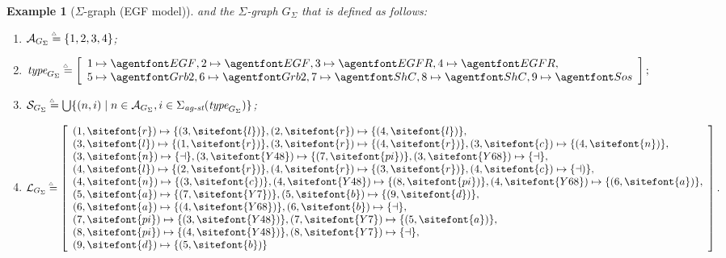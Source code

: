 \documentclass{entcs}
\newcommand{\map}[2]{#2}
\newcommand{\freesymbol}{\dashv}
\newcommand{\graphsymb}{G}
\newcommand{\linksite}{\signaturesymb_{\textit{ag-st}}}
\newcommand{\signaturesymb}{\Sigma}
\newcommand{\bydef}{\stackrel{\scalebox{0.8}{\!\!$\scriptscriptstyle{\triangle}$}}{=}}
\newcommand{\agents}[1][\graphsymb]{\mathcal{A}_{#1}}
\newcommand{\type}[1][\graphsymb]{\textit{type}_{#1}}
\newcommand{\sites}[1][\graphsymb]{\mathcal{S}_{#1}}
\newcommand{\links}[1][\graphsymb]{\mathcal{L}_{#1}}
\newcommand{\graphtuple}[1][]{(\agents[#1],\type[#1],\sites[#1],\links[#1])}
\newtheorem{myexample}[thm]{Example}
\begin{document}
\begin{myexample}[$\Sigma$-graph (EGF model)]
and the $\Sigma$-graph $\graphsymb_{\Sigma}%
$ that is defined as follows:
\begin{enumerate}
  \item $\agents[\graphsymb_{\Sigma}]\bydef\{1,2,3,4\}$;
  \item $\type[\graphsymb_{\Sigma}]\bydef \map{\begin{cases}\begin{array}{ccc}%
  1 &\mapsto&\agent{EGF}{}\cr%
  2 &\mapsto&\agent{EGF}{}\cr%
  3 &\mapsto&\agent{EGFR}{}\cr%
  4 &\mapsto&\agent{EGFR}{}\cr%
  5 &\mapsto&\agent{Grb2}{}\cr%
  6 &\mapsto&\agent{Grb2}{}\cr%
  7 &\mapsto&\agent{ShC}{}\cr%
  8 &\mapsto&\agent{ShC}{}\cr%
  9 &\mapsto&\agent{Sos}{}.
\end{array}\end{cases}}{\left[\begin{array}{l}1 \mapsto \agent{EGF}{}, 2 \mapsto \agent{EGF}{}, 3 \mapsto \agent{EGFR}{}, 4 \mapsto \agent{EGFR}{}, \cr 5 \mapsto \agent{Grb2}{}, 6 \mapsto \agent{Grb2}{}, 7 \mapsto \agent{ShC}{}, 8 \mapsto \agent{ShC}{},
9 \mapsto \agent{Sos}{}\end{array}\right];}$
  \item $\sites[\graphsymb_\Sigma]\bydef
\bigcup \{(n,i)\;|\; n\in \agents[\graphsymb_\Sigma],
i\in\linksite(\type[\graphsymb_{\Sigma}])\}$;
  \item $\links[\graphsymb_{\Sigma}]\bydef\map{}{\left[%
  \begin{array}{l}
    (1,\sitefont{r})\mapsto\{(3,\sitefont{l})\},
    (2,\sitefont{r})\mapsto\{(4,\sitefont{l})\},\cr
    (3,\sitefont{l})\mapsto \{(1,\sitefont{r})\},
    (3,\sitefont{r})\mapsto \{(4,\sitefont{r})\},
    (3,\sitefont{c})\mapsto \{(4,\sitefont{n})\},\cr
    (3,\sitefont{n})\mapsto \{\freesymbol\},
    (3,\sitefont{Y48})\mapsto \{(7,\sitefont{pi})\},
    (3,\sitefont{Y68})\mapsto \{\freesymbol\},\cr
    (4,\sitefont{l})\mapsto \{(2,\sitefont{r})\},
    (4,\sitefont{r})\mapsto \{(3,\sitefont{r})\},
    (4,\sitefont{c})\mapsto \{\freesymbol)\},\cr
    (4,\sitefont{n})\mapsto \{(3,\sitefont{c})\},
    (4,\sitefont{Y48})\mapsto \{(8,\sitefont{pi})\},
    (4,\sitefont{Y68})\mapsto \{(6,\sitefont{a})\},\cr
    (5,\sitefont{a})\mapsto \{(7,\sitefont{Y7})\},
    (5,\sitefont{b})\mapsto \{(9,\sitefont{d})\},\cr
    (6,\sitefont{a})\mapsto \{(4,\sitefont{Y68})\},
    (6,\sitefont{b})\mapsto \{\freesymbol\},\cr
    (7,\sitefont{pi})\mapsto \{(3,\sitefont{Y48})\},
    (7,\sitefont{Y7})\mapsto \{(5,\sitefont{a})\},\cr
    (8,\sitefont{pi})\mapsto \{(4,\sitefont{Y48})\},
    (8,\sitefont{Y7})\mapsto \{\freesymbol\},\cr
(9,\sitefont{d}) \mapsto \{(5,\sitefont{b})\}
  \end{array}\right]}.$
\end{enumerate}
\end{myexample}
\end{document}
